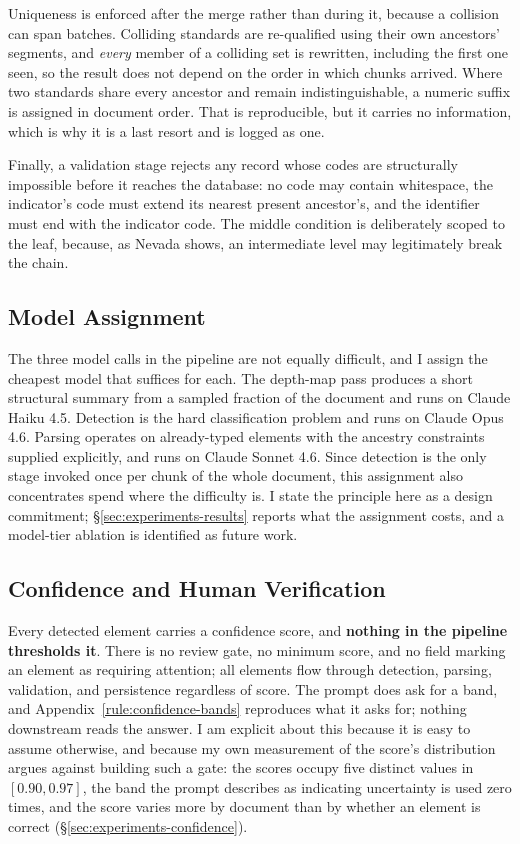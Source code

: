 Uniqueness is enforced after the merge rather than during it, because a collision
can span batches. Colliding standards are re-qualified using their own ancestors'
segments, and \emph{every} member of a colliding set is rewritten, including the
first one seen, so the result does not depend on the order in which chunks
arrived. Where two standards share every ancestor and remain indistinguishable, a
numeric suffix is assigned in document order. That is reproducible, but it
carries no information, which is why it is a last resort and is logged as one.

Finally, a validation stage rejects any record whose codes are structurally
impossible before it reaches the database: no code may contain whitespace, the
indicator's code must extend its nearest present ancestor's, and the identifier
must end with the indicator code. The middle condition is deliberately scoped to
the leaf, because, as Nevada shows, an intermediate level may legitimately
break the chain.

\subsection{Model Assignment}
\label{sec:method-model-assignment}

The three model calls in the pipeline are not equally difficult, and I assign
the cheapest model that suffices for each. The depth-map pass produces a short
structural summary from a sampled fraction of the document and runs on Claude
Haiku 4.5. Detection is the hard classification problem and runs on Claude Opus
4.6. Parsing operates on already-typed elements with the ancestry constraints
supplied explicitly, and runs on Claude Sonnet 4.6. Since detection is the only
stage invoked once per chunk of the whole document, this assignment also
concentrates spend where the difficulty is. I state the principle here as a
design commitment; \S\ref{sec:experiments-results} reports what the assignment
costs, and a model-tier ablation is identified as future work.

\subsection{Confidence and Human Verification}
\label{sec:method-confidence}

Every detected element carries a confidence score, and \textbf{nothing in the
pipeline thresholds it}. There is no review gate, no minimum score, and no
field marking an element as requiring attention; all elements flow through
detection, parsing, validation, and persistence regardless of score. The prompt
does ask for a band, and Appendix~\ref{rule:confidence-bands} reproduces what it
asks for; nothing downstream reads the answer. I am
explicit about this because it is easy to assume otherwise, and because my own
measurement of the score's distribution argues against building such a gate: the
scores occupy five distinct values in $[0.90, 0.97]$, the band the prompt
describes as indicating uncertainty is used zero times, and the score varies
more by document than by whether an element is correct
(\S\ref{sec:experiments-confidence}).

